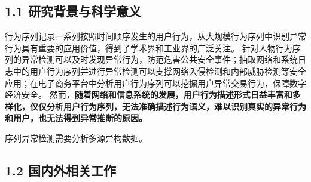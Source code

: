 \subsection{\sihao \kaishu \bfseries 1.1 研究背景与科学意义}

行为序列记录一系列按照时间顺序发生的用户行为，从大规模行为序列中识别异常行为具有重要的应用价值，得到了学术界和工业界的广泛关注。
针对人物行为序列的异常检测可以及时发现异常行为，防范危害公共安全事件；抽取网络和系统日志中的用户行为序列并进行异常检测可以支撑网络入侵检测和内部威胁检测等安全应用；在电子商务平台中分析用户行为序列可以挖掘用户异常交易行为，保障数字经济安全。
然而，\textbf{\songti 随着网络和信息系统的发展，用户行为描述形式日益丰富和多样化，仅仅分析用户行为序列，无法准确描述行为语义，难以识别真实的异常行为和用户，也无法得到异常推断的原因。}

序列异常检测需要分析多源异构数据。




\subsection{\sihao \songti \bfseries 1.2 国内外相关工作}


